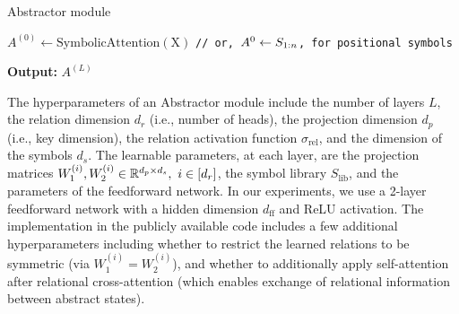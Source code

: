 \begin{algorithm}[ht!]
	\caption{Abstractor module}\label{alg:abstractor_module}

	\vspace{1em}

    $A^{(0)} \gets \mathrm{SymbolicAttention(X)}$ \quad \texttt{// or, $A^{0} \gets S_{1:n}$, for positional symbols}


    \textbf{Output:} $A^{(L)}$

\end{algorithm}

The hyperparameters of an Abstractor module include the number of layers $L$, the relation dimension $d_r$ (i.e., number of heads),  the projection dimension $d_p$ (i.e., key dimension), the relation activation function $\sigma_{\mathrm{rel}}$, and the dimension of the symbols $d_s$. The learnable parameters, at each layer, are the projection matrices $W_1^{(i)}, W_2^{(i)} \in \mathbb{R}^{d_p \times d_s}, \ i \in [d_r]$, the symbol library $S_{\mathrm{lib}}$, and the parameters of the feedforward network. In our experiments, we use a 2-layer feedforward network with a hidden dimension $d_{\mathrm{ff}}$ and ReLU activation. The implementation in the publicly available code includes a few additional hyperparameters including whether to restrict the learned relations to be symmetric (via $W_1^{(i)} = W_2^{(i)}$), and whether to additionally apply self-attention after relational cross-attention (which enables exchange of relational information between abstract states).

